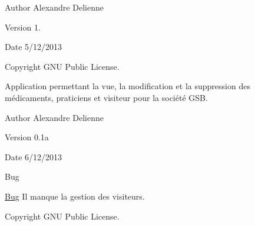 \begin{DoxyAuthor}{Author}
Alexandre Delienne 
\end{DoxyAuthor}
\begin{DoxyVersion}{Version}
1. 
\end{DoxyVersion}
\begin{DoxyDate}{Date}
5/12/2013 
\end{DoxyDate}
\begin{DoxyCopyright}{Copyright}
G\-N\-U Public License.
\end{DoxyCopyright}
Application permettant la vue, la modification et la suppression des médicaments, praticiens et visiteur pour la société G\-S\-B. \begin{DoxyAuthor}{Author}
Alexandre Delienne 
\end{DoxyAuthor}
\begin{DoxyVersion}{Version}
0.\-1a 
\end{DoxyVersion}
\begin{DoxyDate}{Date}
6/12/2013 
\end{DoxyDate}
\begin{DoxyRefDesc}{Bug}
\item[\hyperlink{bug__bug000001}{Bug}]Il manque la gestion des visiteurs. \begin{DoxyCopyright}{Copyright}
G\-N\-U Public License. 
\end{DoxyCopyright}
\end{DoxyRefDesc}
